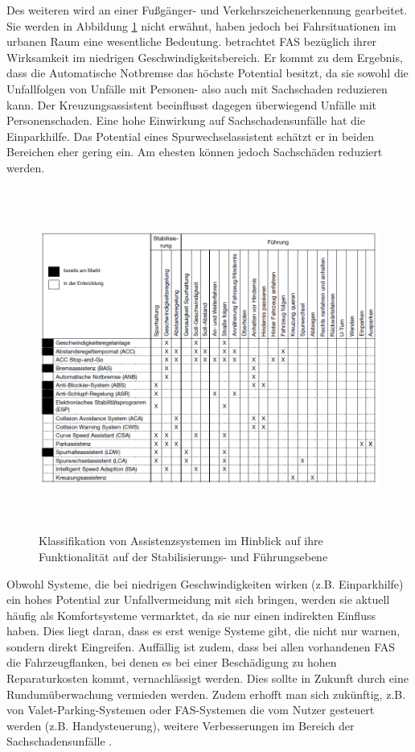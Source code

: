 Des weiteren wird an einer Fußgänger- und Verkehrszeichenerkennung gearbeitet. Sie werden in Abbildung \ref{fig:FAS} nicht erwähnt, haben jedoch bei Fahrsituationen im urbanen Raum eine wesentliche Bedeutung. \Textcite[S. 52]{Gschwendtner.2015} betrachtet \ac{FAS} bezüglich ihrer Wirksamkeit im niedrigen Geschwindigkeitsbereich. Er kommt zu dem Ergebnis, dass die Automatische Notbremse das höchste Potential besitzt, da sie sowohl die Unfallfolgen von Unfälle mit Personen- also auch mit Sachschaden reduzieren kann. Der Kreuzungsassistent beeinflusst dagegen überwiegend Unfälle mit Personenschaden. Eine hohe Einwirkung auf Sachschadensunfälle hat die Einparkhilfe. Das Potential eines Spurwechselassistent schätzt er in beiden Bereichen eher gering ein. Am ehesten können jedoch Sachschäden reduziert werden.

\begin{savenotes}
	\begin{figure}[H]
		\centering
		\includegraphics[width=15cm,height=11.25cm]{figures/FAS}
		\caption[Klassifikation von Assistenzsystemen im Hinblick auf ihre Funktionalität auf der Stabilisierungs- und Führungsebene]{Klassifikation von Assistenzsystemen im Hinblick auf ihre Funktionalität auf der Stabilisierungs- und Führungsebene \parencite[S. 31]{Vollrath.2006}}\label{fig:FAS}
	\end{figure}
\end{savenotes}

Obwohl Systeme, die bei niedrigen Geschwindigkeiten wirken (z.B. Einparkhilfe) ein hohes Potential zur Unfallvermeidung mit sich bringen, werden sie aktuell häufig als Komfortsysteme vermarktet, da sie nur einen indirekten Einfluss haben. Dies liegt daran, dass es erst wenige Systeme gibt, die nicht nur warnen, sondern direkt Eingreifen. Auffällig ist zudem, dass bei allen vorhandenen \ac{FAS} die Fahrzeugflanken, bei denen es bei einer Beschädigung zu hohen Reparaturkosten kommt, vernachlässigt werden. Dies sollte in Zukunft durch eine Rundumüberwachung vermieden werden. Zudem erhofft man sich zukünftig, z.B. von Valet-Parking-Systemen oder FAS-Systemen die vom Nutzer gesteuert werden (z.B. Handysteuerung), weitere Verbesserungen im Bereich der Sachschadensunfälle \parencite[S. 18-21]{Gschwendtner.2015}.

